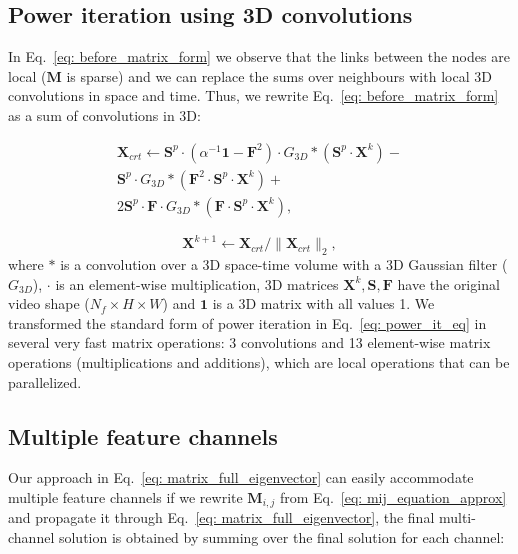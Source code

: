 \documentclass{article}
\begin{document}
\subsection{Power iteration using 3D convolutions}
In Eq.~\ref{eq: before_matrix_form} we observe that the links between the nodes are local ($\textbf{M}$ is sparse) and we can replace the sums over neighbours with local 3D convolutions in space and time. Thus, we rewrite Eq.~\ref{eq: before_matrix_form} as a sum of convolutions in 3D:

\begin{equation}
\begin{aligned}
\mathbf{X}_{crt} \leftarrow \mathbf{S}^p \cdot (\alpha^{-1} \mathbf{1} - \mathbf{F}^2) \cdot G_{3D} * (\mathbf{S}^p  \cdot \mathbf{X}^k) - \\
                        \mathbf{S}^p \cdot G_{3D} * (\mathbf{F}^2 \cdot \mathbf{S}^p \cdot \mathbf{X}^k) + \\
                        2 \mathbf{S}^p \cdot \mathbf{F}\cdot G_{3D} * (\mathbf{F} \cdot \mathbf{S}^p \cdot \mathbf{X}^k),
\end{aligned}
\label{eq: matrix_full_eigenvector}
\end{equation}

\begin{equation}
\mathbf{X}^{k+1} \leftarrow \mathbf{X}_{crt} / \|\mathbf{X}_{crt}\|_2,
\end{equation}
where $*$ is a convolution over a 3D space-time volume with a 3D Gaussian filter ($G_{3D}$), $\cdot$ is an element-wise multiplication, 3D matrices $\mathbf{X}^k, \mathbf{S}, \mathbf{F}$ have the original video shape ($N_f \times H \times W$) and $\mathbf{1}$ is a 3D matrix with all values 1. We transformed the 
standard form of power iteration in Eq.~\ref{eq: power_it_eq} in several very fast matrix operations: 3 convolutions and 13 element-wise matrix operations (multiplications and additions), which are local operations that can be parallelized. 
\subsection{Multiple feature channels}
Our approach in Eq.~\ref{eq: matrix_full_eigenvector} can easily accommodate multiple feature channels if we rewrite $\mathbf{M}_{i, j}$ from Eq.~\ref{eq: mij_equation_approx} and propagate it through Eq.~\ref{eq: matrix_full_eigenvector}, the final multi-channel solution is obtained by summing over the final solution for each channel:
\end{document}
